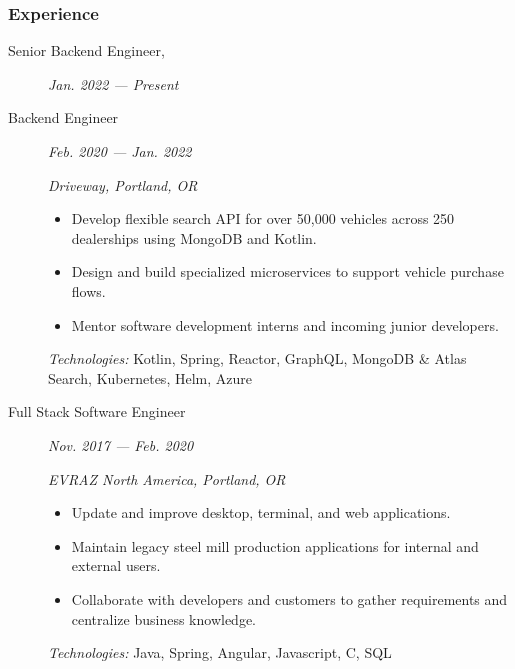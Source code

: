 \documentclass{article}
\begin{document}

\subsubsection*{Experience}

    \begin{description}
		
	\item[Senior Backend Engineer,] \hfill \textit{Jan. 2022 — Present}
	\item[Backend Engineer] \hfill \textit{Feb. 2020 — Jan. 2022}
		
        \textit{Driveway, Portland, OR}
        \begin{itemize}
        \item Develop flexible search API for over 50,000 vehicles across 250 dealerships using MongoDB and Kotlin.
        \item Design and build specialized microservices to support vehicle purchase flows.
        \item Mentor software development interns and incoming junior developers.
        \end{itemize}
        \textit{Technologies:} Kotlin, Spring, Reactor, GraphQL, MongoDB \& Atlas Search, Kubernetes, Helm, Azure
		\vspace{0.5em}

	\item[Full Stack Software Engineer] \hfill \textit{Nov. 2017 — Feb. 2020}
		
        \textit{EVRAZ North America, Portland, OR}
        \begin{itemize}     
            \item Update and improve desktop, terminal, and web applications.
            \item Maintain legacy steel mill production applications for internal and external users.
            \item Collaborate with developers and customers to gather requirements and centralize business knowledge.
        \end{itemize}
        \textit{Technologies:} Java, Spring, Angular, Javascript, C, SQL
        
    \end{description}
\end{document}
